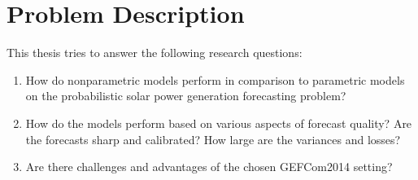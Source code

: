 \section{Problem Description}
\label{sec:problem-description}

This thesis tries to answer the following research questions:
\begin{enumerate}
    \item How do nonparametric models perform in comparison to parametric models 
    on the probabilistic solar power generation forecasting problem?
    \item How do the models perform based on various aspects of forecast 
    quality? Are the forecasts sharp and calibrated? How large are the variances and losses?
    \item Are there challenges and advantages of the chosen GEFCom2014 setting?
\end{enumerate}